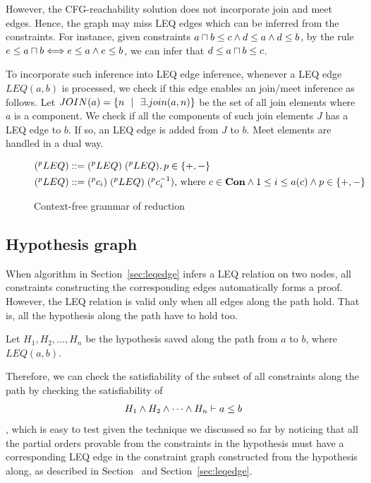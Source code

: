 However, the CFG-reachability solution does not incorporate join and meet
edges. Hence, the graph may miss LEQ edges which can be inferred from the
constraints. For instance,  given constraints $a\sqcap b \leq c\land d\leq a
\land d\leq b$, by the rule $e\leq a\sqcap b \Longleftrightarrow e\leq a\land e\leq b$, we can
infer that $d\leq a\sqcap b \leq c$. 

To incorporate such inference into LEQ edge inference, whenever a LEQ edge
$LEQ(a,b)$ is processed, we check if this edge enables an join/meet inference
as follows. Let $JOIN(a)=\{n \ \ | \ \  \exists. join(a,n) \}$ be the set of all join
elements where $a$ is a component. We check if all the components of such join
elements $J$ has a LEQ edge to $b$. If so, an LEQ edge is added from $J$ to
$b$. Meet elements are handled in a dual way.

\begin{figure}
\hfil
\begin{minipage}{2.3in}
\begin{align*}
(^{p}LEQ) ::=\; & (^{p}LEQ)\; (^{p}LEQ), p\in \{+,-\} \\
(^{p}LEQ) ::=\; & (^{p}c_i)\; (^{p}LEQ)\; (^{p}c_i^{-1}) \text{, where }  
    c\in \mathbf{Con} \land 1 \leq i\leq a(c) \land p\in \{+,-\}\\
\end{align*}
\end{minipage}
\caption{Context-free grammar of reduction}
\label{figure:cfg}
\end{figure}

\subsection{Hypothesis graph}
\label{sec:hypograph}

When algorithm in Section~\ref{sec:leqedge} infers a LEQ relation on two nodes,
all constraints constructing the corresponding edges automatically forms a
proof. However, the LEQ relation is valid only when all edges along the path
hold. That is, all the hypothesis along the path have to hold too.

Let $H_1, H_2, \dots, H_n$ be the hypothesis saved along the path from $a$ to
$b$, where $LEQ(a,b)$. 

Therefore, we can check the satisfiability of the subset of all constraints
along the path by checking the satisfiability of 
\[H_1 \land H_2 \land \dots \land H_n \vdash a \leq b\]
, which is easy to test given the technique we discussed so far by noticing
that all the partial orders provable from the constraints in the hypothesis
must have a corresponding LEQ edge in the constraint graph constructed from the
hypothesis along, as described in Section~\label{sec:consgraph} and
Section~\ref{sec:leqedge}.

